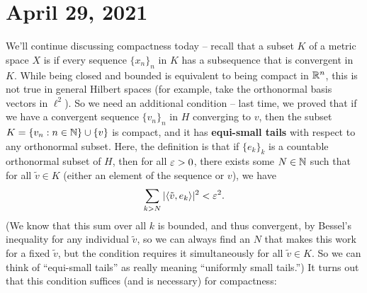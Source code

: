 \pagebreak\section*{April 29, 2021}

We'll continue discussing compactness today -- recall that a subset $K$ of a metric space $X$ is  if every sequence $\{x_n\}_n$ in $K$ has a subsequence that is convergent in $K$. While being closed and bounded is equivalent to being compact in $\mathbb R^n$, this is not true in general Hilbert spaces (for example, take the orthonormal basis vectors in $\ell^2$). So we need an additional condition -- last time, we proved that if we have a convergent sequence $\{v_n\}_n$ in $H$ converging to $v$, then the subset $K = \{v_n: n \in \mathbb N\} \cup \{v\}$ is compact, and it has \textbf{equi-small tails} with respect to any orthonormal subset. Here, the definition is that if $\{e_k\}_k$ is a countable orthonormal subset of $H$, then for all $\varepsilon > 0$, there exists some $N \in \mathbb N$ such that for all $\tilde{v} \in K$ (either an element of the sequence or $v$), we have 
\[
    \sum_{k > N} |\langle \tilde{v}, e_k \rangle|^2 < \varepsilon^2.
\]
(We know that this sum over all $k$ is bounded, and thus convergent, by Bessel's inequality for any individual $\tilde{v}$, so we can always find an $N$ that makes this work for a fixed $\tilde{v}$, but the condition requires it simultaneously for all $\tilde{v} \in K$. So we can think of ``equi-small tails'' as really meaning ``uniformly small tails.'') It turns out that this condition suffices (and is necessary) for compactness:

